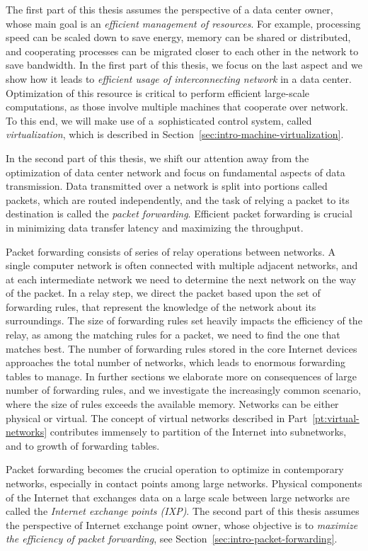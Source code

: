 The first part of this thesis assumes the perspective of a data center owner, whose main goal is an \emph{efficient management of resources}.
For example, processing speed can be scaled down to save energy, memory can be shared or distributed, and cooperating processes can be migrated closer to each other in the network to save bandwidth.
In the first part of this thesis, we focus on the last aspect and we show how it leads to
\emph{efficient usage of interconnecting network} in a data center.
Optimization of this resource is critical to perform efficient large-scale computations, as those involve multiple machines that cooperate over network.
To this end, we will make use of a~sophisticated control system, called \emph{virtualization}, which is described in Section~\ref{sec:intro-machine-virtualization}.


In the second part of this thesis, we shift our attention away from the optimization of data center network and focus on fundamental aspects of data transmission.
Data transmitted over a network is split into portions called packets, which are routed independently, and the task of relying a packet to its destination is called the \emph{packet forwarding}.
Efficient packet forwarding is crucial in minimizing data transfer latency and maximizing the throughput.

Packet forwarding consists of series of relay operations between networks.
A single computer network is often connected with multiple adjacent networks, and at each intermediate network we need to determine the next network on the way of the packet.
In a relay step, we direct the packet based upon the set of forwarding rules, that represent the knowledge of the network about its surroundings.
The size of forwarding rules set heavily impacts the efficiency of the relay, as among the matching rules for a packet, we need to find the one that matches best.
The number of forwarding rules stored in the core Internet devices approaches the total number of networks, which leads to enormous forwarding tables to manage.
In further sections we elaborate more on consequences of large number of forwarding rules, and we investigate the increasingly common scenario, where the size of rules exceeds the available memory.
Networks can be either physical or virtual.
The concept of virtual networks described in Part~\ref{pt:virtual-networks} contributes immensely to partition of the Internet into subnetworks, and to growth of forwarding tables.


Packet forwarding becomes the crucial operation to optimize in contemporary networks, especially in contact points among large networks.
Physical components of the Internet that exchanges data on a large scale between large networks are called the \emph{Internet exchange points (IXP)}.
The second part of this thesis assumes the perspective of Internet exchange point owner, whose objective is to \emph{maximize the efficiency of packet forwarding}, see Section~\ref{sec:intro-packet-forwarding}.


